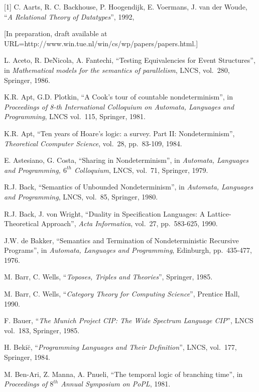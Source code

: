  [1] C. Aarts, R. C. Backhouse, P. Hoogendijk, E. Voermans, J. 
van der Woude, ``{\em A Relational Theory of Datatypes}'', 1992, 

{\small{[In preparation, 
draft available at URL=http://www.win.tue.nl/win/cs/wp/papers/papers.html.]}\normalsize}

 L. Aceto, R. DeNicola, A. Fantechi, ``Testing 
Equivalencies for Event Structures'', in {\em Mathematical models for the 
semantics of parallelism}, LNCS, vol.~280, Springer, 1986.

 K.R. Apt, G.D. Plotkin, ``A Cook's tour of countable 
nondeterminism'', in {\em Proceedings of 8-th International Colloquium on 
Automata, Languages and Programming}, LNCS vol.~115, Springer, 1981.

 K.R. Apt, ``Ten years of Hoare's logic: a survey.  Part 
II: Nondeterminism'', {\em Theoretical Ccomputer Science}, vol.~28, pp.~83-109, 
1984.

 E. Astesiano, G. Costa, ``Sharing in Nondeterminism'', in 
{\em Automata, Languages and Programming, $6^{th}$ Colloquium}, LNCS, vol.~71, 
Springer, 1979.

 R.J. Back, ``Semantics of Unbounded Nondeterminism'', in 
{\em Automata, Languages and Programming}, LNCS, vol.~85, Springer, 1980.

 R.J. Back, J. von Wright, ``Duality in Specification 
Languages: A Lattice-Theoretical Approach'', {\em Acta Informatica}, 
vol.~27, pp.~583-625, 1990.

 J.W. de Bakker, ``Semantics and Termination of 
Nondeterministic Recursive Programs'', in {\em Automata, Languages and 
Programming}, Edinburgh, pp.~435-477, 1976.

 M. Barr, C. Wells, ``{\em Toposes, Triples and 
Theories}'', Springer, 1985.

 M. Barr, C. Wells, ``{\em Category Theory for Computing 
Science}'', Prentice Hall, 1990.

 F. Bauer, ``{\em The Munich Project CIP: The Wide 
Spectrum Language CIP}'', LNCS vol.~183, Springer, 1985.

 H. Beki\u{c}, ``{\em Programming Languages and Their 
Definition}'', LNCS, vol.~177, Springer, 1984.

 M. Ben-Ari, Z. Manna, A. Pnueli, ``The temporal logic of 
branching time'', in {\em Proceedings of $8^{th}$ Annual Symposium on PoPL}, 
1981.

